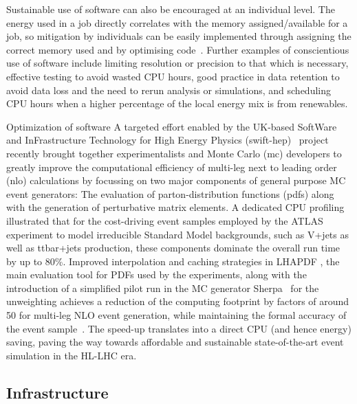 \documentclass[../SustainableHEP.tex]{subfiles}
\begin{document}
Sustainable use of software can also be encouraged at an individual level. The energy used in a job directly correlates with the memory assigned/available for a job, so mitigation by individuals can be easily implemented through assigning the correct memory used and by optimising code~\cite{Karayakin}. Further examples of conscientious use of software include limiting resolution or precision to that which is necessary, effective testing to avoid wasted CPU hours, good practice in data retention to avoid data loss and the need to rerun analysis or simulations, and scheduling CPU hours when a higher percentage of the local energy mix is from renewables.

\begin{bestpractice}{Optimization of software}%
A targeted effort enabled by the UK-based SoftWare and InFrastructure Technology for High Energy Physics (\acrshort{swift-hep})~\cite{SWIFTHEP} project recently brought together experimentalists and Monte Carlo (\acrshort{mc}) developers to greatly improve the computational efficiency of multi-leg next to leading order (\acrshort{nlo}) calculations by focussing on two major components of general purpose MC event generators: The evaluation of parton-distribution functions (\acrshort{pdf}s) along with the generation of perturbative matrix elements. A dedicated CPU profiling illustrated that for the cost-driving event samples employed by the ATLAS experiment to model irreducible Standard Model backgrounds, such as V+jets as well as ttbar+jets production, these components dominate the overall run time by up to 80\%. Improved interpolation and caching strategies in LHAPDF \cite{Buckley:2014ana}, the main evaluation tool for PDFs used by the experiments, along with the introduction of a simplified pilot run in the MC generator Sherpa~\cite{Sherpa} for the unweighting achieves a reduction of the computing footprint by factors of around 50 for multi-leg NLO event generation, while maintaining the formal accuracy of the event sample~\cite{Bothmann:2022thx}. The speed-up translates into a direct CPU (and hence energy) saving, paving the way towards affordable and sustainable state-of-the-art event simulation in the HL-LHC era.

\end{bestpractice}


\subsection{Infrastructure}\label{subsec:infrastructure}
\end{document}
